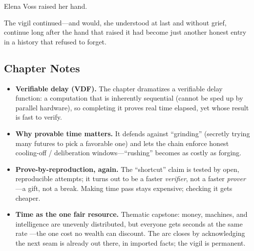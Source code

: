 Elena Voss raised her hand.

The vigil continued---and would, she understood at last and without grief, continue
long after the hand that raised it had become just another honest entry in a history
that refused to forget.

\hypertarget{chapter-20-notes}{%
\subsection{Chapter Notes}\label{chapter-20-notes}}

\begin{itemize}
\tightlist
\item
  \textbf{Verifiable delay (VDF).} The chapter dramatizes a verifiable delay
  function: a computation that is inherently sequential (cannot be sped up by
  parallel hardware), so completing it proves real time elapsed, yet whose result
  is fast to verify.
\item
  \textbf{Why provable time matters.} It defends against ``grinding'' (secretly
  trying many futures to pick a favorable one) and lets the chain enforce honest
  cooling-off / deliberation windows---``rushing'' becomes as costly as forging.
\item
  \textbf{Prove-by-reproduction, again.} The ``shortcut'' claim is tested by open,
  reproducible attempts; it turns out to be a faster \emph{verifier}, not a faster
  \emph{prover}---a gift, not a break. Making time pass stays expensive; checking
  it gets cheaper.
\item
  \textbf{Time as the one fair resource.} Thematic capstone: money, machines, and
  intelligence are unevenly distributed, but everyone gets seconds at the same rate
  ---the one cost no wealth can discount. The arc closes by acknowledging the next
  seam is already out there, in imported facts; the vigil is permanent.
\end{itemize}
